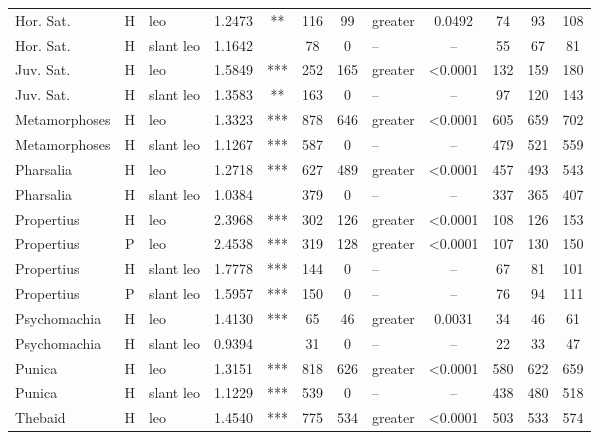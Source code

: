 \documentclass[twocolumn, switch, a4paper]{article} %
\begin{document}
\begin{table}[h!]
\begin{adjustbox}{totalheight=0.9\textheight}
\begin{tabular}{lclcccclcc@{\hspace{1\tabcolsep}}c@{\hspace{1\tabcolsep}}c}
     Hor. Sat. &     H &        leo & 1.2473 &    ** &  116 &        99 &     greater & 0.0492 &   74 &   93 &  108 \\
     Hor. Sat. &     H &  slant leo & 1.1642 &       &   78 &         0 &        -- & -- &   55 &   67 &   81 \\
     Juv. Sat. &     H &        leo & 1.5849 &   *** &  252 &       165 &     greater & <0.0001 &  132 &  159 &  180 \\
     Juv. Sat. &     H &  slant leo & 1.3583 &    ** &  163 &         0 &        -- & -- &   97 &  120 &  143 \\
 Metamorphoses &     H &        leo & 1.3323 &   *** &  878 &       646 &     greater & <0.0001 &  605 &  659 &  702 \\
 Metamorphoses &     H &  slant leo & 1.1267 &   *** &  587 &         0 &        -- & -- &  479 &  521 &  559 \\
     Pharsalia &     H &        leo & 1.2718 &   *** &  627 &       489 &     greater & <0.0001 &  457 &  493 &  543 \\
     Pharsalia &     H &  slant leo & 1.0384 &       &  379 &         0 &        -- & -- &  337 &  365 &  407 \\
    Propertius &     H &        leo & 2.3968 &   *** &  302 &       126 &     greater & <0.0001 &  108 &  126 &  153 \\
    Propertius &     P &        leo & 2.4538 &   *** &  319 &       128 &     greater & <0.0001 &  107 &  130 &  150 \\
    Propertius &     H &  slant leo & 1.7778 &   *** &  144 &         0 &        -- & -- &   67 &   81 &  101 \\
    Propertius &     P &  slant leo & 1.5957 &   *** &  150 &         0 &        -- & -- &   76 &   94 &  111 \\
  Psychomachia &     H &        leo & 1.4130 &   *** &   65 &        46 &     greater & 0.0031 &   34 &   46 &   61 \\
  Psychomachia &     H &  slant leo & 0.9394 &       &   31 &         0 &        -- & -- &   22 &   33 &   47 \\
        Punica &     H &        leo & 1.3151 &   *** &  818 &       626 &     greater & <0.0001 &  580 &  622 &  659 \\
        Punica &     H &  slant leo & 1.1229 &   *** &  539 &         0 &        -- & -- &  438 &  480 &  518 \\
       Thebaid &     H &        leo & 1.4540 &   *** &  775 &       534 &     greater & <0.0001 &  503 &  533 &  574 \\

\end{tabular}
\end{adjustbox}
\end{table}
\end{document}
